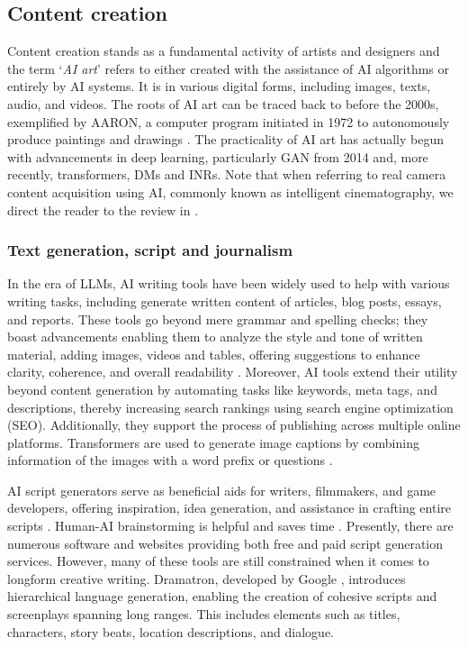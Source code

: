 \documentclass[11pt,a4paper]{article}
\begin{document}
\subsection{Content creation}

Content creation stands as a fundamental activity of artists and designers and the term `\textit{AI art}' refers to either created with the assistance of AI algorithms or entirely by AI systems. It is in various digital forms, including images, texts, audio, and videos. The roots of AI art can be traced back to before the 2000s, exemplified by AARON, a computer program initiated in 1972 to autonomously produce paintings and drawings \cite{encyclopedia_ai_v1}. The practicality of AI art has actually begun with advancements in deep learning, particularly GAN from 2014 and, more recently, transformers, DMs and INRs. Note that when referring to real camera content acquisition using AI, commonly known as intelligent cinematography, we direct the reader to the review in \cite{Azzarelli:Reviewing:2024}.

\subsubsection{Text generation, script and journalism}

In the era of LLMs, AI writing tools have been widely used to help with various writing tasks, including generate written content of articles, blog posts, essays, and reports. These tools go beyond mere grammar and spelling checks; they boast advancements enabling them to analyze the style and tone of written material, adding images, videos and tables, offering suggestions to enhance clarity, coherence, and overall readability \cite{ippolito:creative:2022}. Moreover, AI tools extend their utility beyond content generation by automating tasks like keywords, meta tags, and descriptions, thereby increasing search rankings using search engine optimization (SEO). Additionally, they support the process of publishing across multiple online platforms. Transformers are used to generate image captions by combining information of the images with a word prefix or questions \cite{Wang:SIMVLM:2022}.

AI script generators serve as beneficial aids for writers, filmmakers, and game developers, offering inspiration, idea generation, and assistance in crafting entire scripts \cite{Jeary2024, Azzarelli:Reviewing:2024}. Human-AI brainstorming is helpful and saves time \cite{guo:exploring:2024}. Presently, there are numerous software and websites providing both free and paid script generation services. However, many of these tools are still constrained when it comes to longform creative writing. Dramatron, developed by Google \cite{Mirowski:cowriting:2023}, introduces hierarchical language generation, enabling the creation of cohesive scripts and screenplays spanning long ranges. This includes elements such as titles, characters, story beats, location descriptions, and dialogue.
\end{document}
